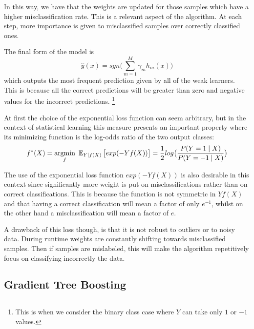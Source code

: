 In this way, we have that the weights are updated for those samples which have a higher misclassification rate. This is a relevant aspect of the algorithm. At each step, more importance is given to misclassified samples over correctly classified ones.



The final form of the model is
\begin{equation}
 \hat{y}(x) = sgn\big( \sum_{m=1}^{M} \gamma_m h_m(x) \big)
\end{equation}
  which outputs the most frequent prediction given by all of the weak learners. This is because all the correct predictions will be greater than zero and negative values for the incorrect predictions. \footnote{This is when we consider the binary class case where $Y$ can take only $1$ or $-1$ values.}

At first the choice of the exponential loss function can seem arbitrary, but in the context of statistical learning this measure presents an important property where its minimizing function is the log-odds ratio of the two output classes:
\begin{equation}
f^*(X) = \underset{f}{\mathrm{argmin}} \ \Expect_{Y | f(X)}\big[ exp(-Yf(X)) \big] = \frac{1}{2}
log\big( \frac{ P(Y=1 \mid X) }{ P(Y=-1 \mid X) } \big)
\end{equation}


The use of the exponential loss function $exp(-Yf(X))$ is also desirable in this context since significantly more weight is put on misclassifications rather than on correct classifications. This is because the function is not symmetric in $Yf(X)$ and that having a correct classification will mean a factor of only $e^{-1}$, whilst on the other hand a misclassification will mean a factor of $e$.

A drawback of this loss though, is that it is not robust to outliers or to noisy data. During runtime weights are constantly shifting towards misclassified samples. Then if samples are mislabeled, this will make the algorithm repetitively focus on classifying incorrectly the data.



\subsection{Gradient Tree Boosting}

